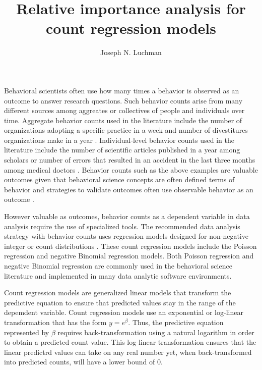 \documentclass[man]{apa7}
\title{Relative importance analysis for count regression models}
\author{Joseph N. Luchman}
\affiliation{Fors Marsh}
\begin{document}
\maketitle

	Behavioral scientists often use how many times a behavior is observed as an outcome to answer research questions. 
	Such behavior counts arise from many different sources among aggreates or collectives of people and individuals over time.
	Aggregate behavior counts used in the literature include the number of organizations adopting a specific practice in a week \parencite{naumovska2021strength} and number of divestitures organizations make in a year \parencite{bettinazzi2021stakeholder}. 
	Individual-level behavior counts used in the literature include the number of scientific articles published in a year among scholars \parencite{rotolo2013does} or number of errors that resulted in an accident in the last three months among medical doctors \parencite{naveh2015active}.
	Behavior counts such as the above examples are valuable outcomes given that behavioral science concepts are often defined terms of behavior \parencite[e.g., job performance;][]{motowidlo2003job} and strategies to validate outcomes often use observable behavior as an outcome \parencite[e.g., criterion-oriented validity;][]{cronbach1955construct}.
	
	However valuable as outcomes, behavior counts as a dependent variable in data analysis require the use of specialized tools.
	The recommended data analysis strategy with behavior counts uses regression models designed for non-negative integer or count distributions \parencite[e.g.,][]{blevins2015count}.
	These count regression models include the Poisson regression and negative Binomial regression models.
	Both Poisson regression and negative Binomial regression are commonly used in the behavioral science literature and implemented in many data analytic software environments.
	
	Count regression models are generalized linear models that transform the predictive equation to ensure that predicted values stay in the range of the depemdent variable.
	Count regression models use an exponential or log-linear transformation that has the form $y = e^{\beta}$. 
	Thus, the predictive equation represented by $\beta$ requires back-transformation using a natural logarithm in order to obtain a predicted count value.
	This log-linear transformation ensures that the linear predictrd values can take on any real number yet, when back-transformed into predicted counts, will have a lower bound of 0.
	
\end{document}
